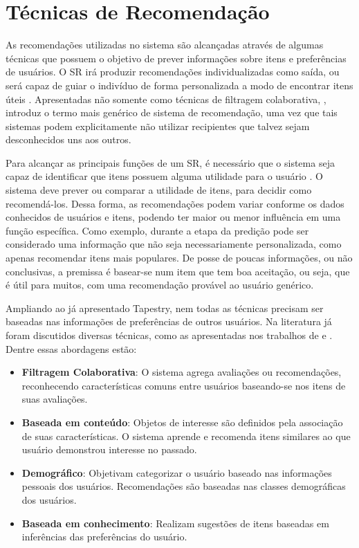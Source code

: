 \section{Técnicas de Recomendação}
\label{sec:tecnicnasRecomendacao}

As recomendações utilizadas no sistema são alcançadas através de algumas técnicas que possuem o objetivo de prever informações sobre itens e preferências de usuários. O SR irá produzir recomendações individualizadas como saída, ou será capaz de guiar o indivíduo de forma personalizada a modo de encontrar itens úteis \citep{Burke:2002:HRS:586321.586352}. Apresentadas não somente como técnicas de filtragem colaborativa, \cite{Resnick:1997:RS:245108.245121}, introduz o termo mais genérico de sistema de recomendação, uma vez que tais sistemas podem explicitamente não utilizar recipientes que talvez sejam desconhecidos uns aos outros. 

Para alcançar as principais funções de um SR, é necessário que o sistema seja capaz de identificar que itens possuem alguma utilidade para o usuário \citep{Ricci2011}. O sistema deve prever ou comparar a utilidade de itens, para decidir como recomendá-los. Dessa forma, as recomendações podem variar conforme os dados conhecidos de usuários e itens, podendo ter maior ou menor influência em uma função específica. Como exemplo, durante a etapa da predição pode ser considerado uma informação que não seja necessariamente personalizada, como apenas recomendar itens mais populares. De posse de poucas informações, ou não conclusivas, a premissa é basear-se num item que tem boa aceitação, ou seja, que é útil para muitos, com uma recomendação provável ao usuário genérico.

Ampliando ao já apresentado Tapestry\citep{Goldberg:1992:UCF:138859.138867}, nem todas as técnicas precisam ser baseadas nas informações de preferências de outros usuários. Na literatura já foram discutidos diversas técnicas, como as apresentadas nos trabalhos de \citep{Ricci2011} e  \citep{ Burke:2002:HRS:586321.586352}. Dentre essas abordagens estão:

\begin{itemize}
	\item{\textbf{Filtragem Colaborativa}: O sistema agrega avaliações ou recomendações, reconhecendo características comuns entre usuários baseando-se nos itens de suas avaliações.}

	\item{\textbf{Baseada em conteúdo}: Objetos de interesse são definidos pela associação de suas características. O sistema aprende e recomenda itens similares ao que usuário demonstrou interesse no passado.}

	\item{\textbf{Demográfico}: Objetivam categorizar o usuário baseado nas informações pessoais dos usuários. Recomendações são baseadas nas classes demográficas dos usuários.}

	\item{\textbf{Baseada em conhecimento}: Realizam sugestões de itens baseadas em inferências das preferências do usuário.}
\end{itemize}

